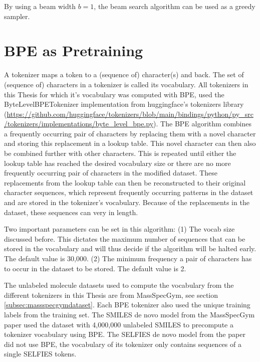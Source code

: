 By using a beam width $b=1$, the beam search algorithm can be used as a greedy sampler.

\section{BPE as Pretraining}
\label{sec:bpe}

A tokenizer maps a token to a (sequence of) character(s) and back. The set of (sequence of) characters in a tokenizer is called its vocabulary.
All tokenizers in this Thesis for which it's vocabulary was computed with \acf{BPE}, used the ByteLevelBPETokenizer implementation from huggingface's tokenizers library (\url{https://github.com/huggingface/tokenizers/blob/main/bindings/python/py_src/tokenizers/implementations/byte_level_bpe.py}).
The \ac{BPE} algorithm combines a frequently occurring pair of characters by replacing them with a novel character and storing this replacement in a lookup table.
This novel character can then also be combined further with other characters. 
This is repeated until either the lookup table has reached the desired vocabulary size or there are no more frequently occurring pair of characters in the modified dataset.
These replacements from the lookup table can then be reconstructed to their original character sequences, which represent frequently occurring patterns in the dataset and are stored in the tokenizer's vocabulary.
Because of the replacements in the dataset, these sequences can very in length.

Two important parameters can be set in this algorithm:
(1) The vocab size discussed before. This dictates the maximum number of sequences that can be stored in the vocabulary and will thus decide if the algorithm will be halted early. The default value is 30,000.
(2) The minimum frequency a pair of characters has to occur in the dataset to be stored. The default value is 2.

The unlabeled molecule datasets used to compute the vocabulary from the different tokenizers in this Thesis are from MassSpecGym, see section \ref{subsec:massspecgymdataset}.
Each \ac{BPE} tokenizer also used the unique training labels from the training set.
The SMILES de novo model from the MassSpecGym paper \cite{bushuiev2024massspecgym} used the dataset with 4,000,000 unlabeled SMILES to precompute a tokenizer vocabulary using \ac{BPE}.
The SELFIES de novo model from the paper did not use \ac{BPE}, the vocabulary of its tokenizer only contains sequences of a single SELFIES tokens.

